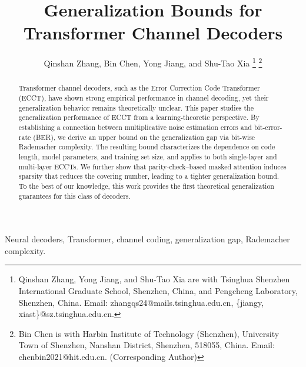 \documentclass[lettersize,onecolumn]{IEEEtran}
\begin{document}
\title{Generalization Bounds for Transformer Channel Decoders}

\author{Qinshan Zhang, Bin Chen, Yong Jiang, and Shu-Tao Xia
\thanks{Qinshan Zhang, Yong Jiang, and Shu-Tao Xia are with Tsinghua Shenzhen International Graduate School, Shenzhen, China, and Pengcheng Laboratory, Shenzhen, China. Email: zhangqs24@mails.tsinghua.edu.cn, \{jiangy, xiast\}@sz.tsinghua.edu.cn.}%
\thanks{Bin Chen is with Harbin Institute of Technology (Shenzhen), University Town of Shenzhen, Nanshan District, Shenzhen, 518055, China. Email: chenbin2021@hit.edu.cn. (Corresponding Author)}}



\maketitle

\begin{abstract}
Transformer channel decoders, such as the Error Correction Code Transformer (ECCT), have shown strong empirical performance in channel decoding, yet their generalization behavior remains theoretically unclear. This paper studies the generalization performance of ECCT from a learning-theoretic perspective. By establishing a connection between multiplicative noise estimation errors and bit-error-rate (BER), we derive an upper bound on the generalization gap via bit-wise Rademacher complexity. The resulting bound characterizes the dependence on code length, model parameters, and training set size, and applies to both single-layer and multi-layer ECCTs. We further show that parity-check–based masked attention induces sparsity that reduces the covering number, leading to a tighter generalization bound. To the best of our knowledge, this work provides the first theoretical generalization guarantees for this class of decoders.
\end{abstract}

\begin{IEEEkeywords}
Neural decoders, Transformer, channel coding, generalization gap, Rademacher complexity.
\end{IEEEkeywords}
\end{document}
